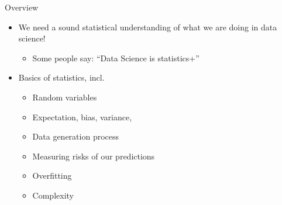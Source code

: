 \documentclass[aspectratio=169]{../latex_main/tntbeamer}  %
\begin{document}
    \begin{frame}[c]{Overview}
        \begin{itemize}
            \item We need a sound statistical understanding of what we are doing in data science!
            \begin{itemize}
                \item Some people say: ``Data Science is statistics+''
            \end{itemize}
            \item Basics of statistics, incl.
            \begin{itemize}
                \item Random variables
                \item Expectation, bias, variance, 
                \item Data generation process
                \item Measuring risks of our predictions
                \item Overfitting
                \item Complexity
            \end{itemize}
        \end{itemize}
        
        
    \end{frame}
\end{document}
